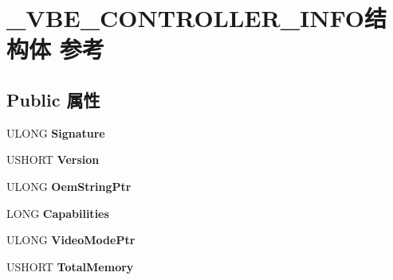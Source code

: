 \hypertarget{struct___v_b_e___c_o_n_t_r_o_l_l_e_r___i_n_f_o}{}\section{\+\_\+\+V\+B\+E\+\_\+\+C\+O\+N\+T\+R\+O\+L\+L\+E\+R\+\_\+\+I\+N\+F\+O结构体 参考}
\label{struct___v_b_e___c_o_n_t_r_o_l_l_e_r___i_n_f_o}
\subsection*{Public 属性}
\begin{DoxyCompactItemize}
\item 
\mbox{\label{struct___v_b_e___c_o_n_t_r_o_l_l_e_r___i_n_f_o_a768b711e07cba6516aa3f55fa6bf09c2}} 
U\+L\+O\+NG {\bfseries Signature}
\item 
\mbox{\label{struct___v_b_e___c_o_n_t_r_o_l_l_e_r___i_n_f_o_ac781bb00e81150d3e7ced7810c863bec}} 
U\+S\+H\+O\+RT {\bfseries Version}
\item 
\mbox{\label{struct___v_b_e___c_o_n_t_r_o_l_l_e_r___i_n_f_o_ab916c15fc69f5ab167c22cb8026307a7}} 
U\+L\+O\+NG {\bfseries Oem\+String\+Ptr}
\item 
\mbox{\label{struct___v_b_e___c_o_n_t_r_o_l_l_e_r___i_n_f_o_a9f54d6110f506aee2f164746e6ff0c92}} 
L\+O\+NG {\bfseries Capabilities}
\item 
\mbox{\label{struct___v_b_e___c_o_n_t_r_o_l_l_e_r___i_n_f_o_a10fccf08cd5d0159de42a801dd66277f}} 
U\+L\+O\+NG {\bfseries Video\+Mode\+Ptr}
\item 
\mbox{\label{struct___v_b_e___c_o_n_t_r_o_l_l_e_r___i_n_f_o_a703646b908c0190db9ff5a857a3c4eb8}} 
U\+S\+H\+O\+RT {\bfseries Total\+Memory}
\item 
\mbox{\label{struct___v_b_e___c_o_n_t_r_o_l_l_e_r___i_n_f_o_a70aeecb6b4e84f4db3fd6d7c8737e235}} 

\end{DoxyCompactItemize}

